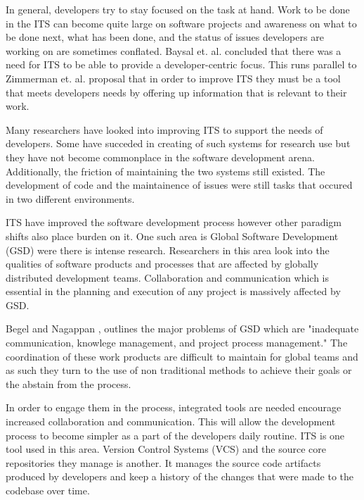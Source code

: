 \documentclass{mproj}
\begin{document}
In general, developers try to stay focused on the task at hand. Work to be done in the ITS can become quite large on software projects and awareness on what to be done next, what has been done, and the status of issues developers are working on are sometimes conflated. Baysal et. al. \cite{Baysal:2013} concluded that there was a need for ITS to be able to provide a developer-centric focus. This runs parallel to Zimmerman et. al. \cite{Zimmerman:2009} proposal that in order to improve ITS they must be a tool that meets developers needs by offering up information that is relevant to their work.

Many researchers have looked into improving ITS to support the needs of developers. Some have succeded in creating of such systems for research use but they have not become commonplace in the software development arena. Additionally, the friction of maintaining the two systems still existed. The development of code and the maintainence of issues were still tasks that occured in two different environments. 


ITS have improved the software development process however other paradigm shifts also place burden on it. One such area is Global Software Development (GSD) were there is intense research. Researchers in this area look into the qualities of software products and processes that are affected by globally distributed development teams. Collaboration and communication which is essential in the planning and execution of any project is massively affected by GSD.

Begel and Nagappan \cite{Begel:2008}, outlines the major problems of GSD which are "inadequate communication, knowlege management, and project process management." The coordination of these work products are difficult to maintain for global teams and as such they turn to the use of non traditional methods to achieve their goals or the abstain from the process.

In order to engage them in the process, integrated tools are needed encourage increased collaboration and communication. This will allow the development process to become simpler as a part of the developers daily routine. ITS is one tool used in this area. Version Control Systems (VCS) and the source core repositories they manage is another. It manages the source code artifacts produced by developers and keep a history of the changes that were made to the codebase over time.
\end{document}

